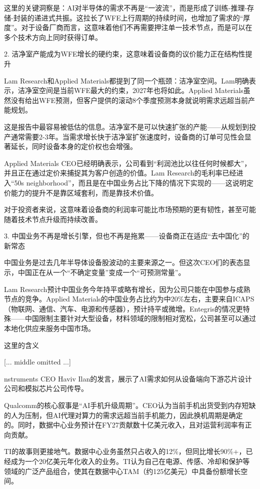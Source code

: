 \documentclass[11pt]{ctexart}
\begin{document}
这里的关键洞察是：AI对半导体的需求不再是“一波流”，而是形成了训练-推理-存储-封装的递进式共振。这拉长了WFE上行周期的持续时间，也增加了需求的“厚度”。对于设备厂商而言，这意味着他们不再需要押注单一技术节点，而是可以在多个技术方向上同时获得订单。

2. 洁净室产能成为WFE增长的硬约束，这意味着设备商的议价能力正在结构性提升

Lam Research和Applied Materials都提到了同一个瓶颈：洁净室空间。Lam明确表示，洁净室空间是当前WFE最大的约束，2027年也将如此。Applied Materials虽然没有给出WFE预测，但客户提供的滚动8个季度预测本身就说明需求远超当前产能规划。

这是报告中最容易被低估的信息。洁净室不是可以快速扩张的产能——从规划到投产通常需要2-3年。当需求增长快于洁净室扩张速度时，设备商的订单可见性会显著延长，同时设备本身的定价权也会增强。

Applied Materials CEO已经明确表示，公司看到“利润池比以往任何时候都大”，并且正在通过定价来捕捉其为客户创造的价值。Lam Research的毛利率已经进入“50s neighborhood”，而且是在中国业务占比下降的情况下实现的——这说明定价能力的提升不是靠区域套利，而是靠技术价值。

对于投资者来说，这意味着设备商的利润率可能比市场预期的更有韧性，甚至可能随着技术节点升级而持续改善。

3. 中国业务不再是增长引擎，但也不再是拖累——设备商正在适应“去中国化”的新常态

中国业务是过去几年半导体设备股波动的主要来源之一。但这次CEO们的表态显示，中国正在从一个“不确定变量”变成一个“可预测常量”。

Lam Research预计中国业务今年持平或略有增长，因为公司只能在中国参与成熟节点的竞争。Applied Materials的中国业务占比约为中20\%左右，主要来自ICAPS（物联网、通信、汽车、电源和传感器），预计持平或微增。Entegris的情况更特殊——中国限制主要针对大型设备，材料领域的限制相对宽松，公司甚至可以通过本地化供应来服务中国市场。

这里的含义

[... middle omitted ...]

nstruments CEO Haviv Ilan的发言，展示了AI需求如何从设备端向下游芯片设计公司和模拟芯片公司传导。

Qualcomm的核心叙事是“AI手机升级周期”。CEO认为当前手机出货受到内存短缺的人为压制，但AI代理对算力的需求远超当前手机能力，因此换机周期是确定的。同时，数据中心业务预计在FY27贡献数十亿美元收入，且对运营利润率有正向贡献。

TI的故事则更接地气。数据中心业务虽然只占收入的12\%，但同比增长90\%+，已经成为一个20亿美元年化收入的业务。TI认为自己在电源、传感、冷却和保护等领域的广泛产品组合，使其在数据中心TAM（约125亿美元）中具备份额增长空间。
\end{document}
